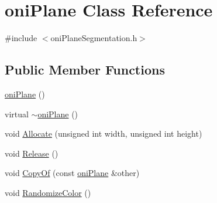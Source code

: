 \hypertarget{classoni_plane}{}\section{oni\+Plane Class Reference}
\label{classoni_plane}


{\ttfamily \#include $<$oni\+Plane\+Segmentation.\+h$>$}

\subsection*{Public Member Functions}
\begin{DoxyCompactItemize}
\item 
\hyperlink{classoni_plane_a8eadfdf8a85d6e08510910f45e839fb8}{oni\+Plane} ()
\item 
virtual \hyperlink{classoni_plane_aa707b959e429b3ff92ad7d6734a228a4}{$\sim$oni\+Plane} ()
\item 
void \hyperlink{classoni_plane_a71932303419aaf7d173cbbe6b9ad12c2}{Allocate} (unsigned int width, unsigned int height)
\item 
void \hyperlink{classoni_plane_a91aaa2167649abcb6766d57001b9fd0d}{Release} ()
\item 
void \hyperlink{classoni_plane_a2ff8f1efff63e70c25ec9cad2c7ed99c}{Copy\+Of} (const \hyperlink{classoni_plane}{oni\+Plane} \&other)
\item 
void \hyperlink{classoni_plane_a12b31a9e64f9ffc9421bf587fafd83c8}{Randomize\+Color} ()
\end{DoxyCompactItemize}
